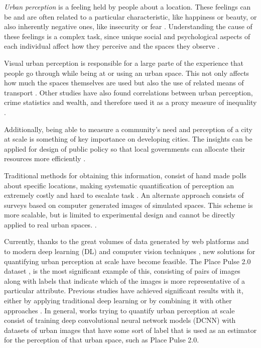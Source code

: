 \textit{Urban perception} is a feeling held by people about a location. These feelings can be and
are often related to a particular characteristic, like happiness or beauty, or also
inherently negative ones, like insecurity or fear \cite{tamara_judgments}. Understanding the
cause of these feelings is a complex task, since unique social and psychological aspects
of each individual affect how they perceive and the spaces they observe \cite{nasar_perception}.

Visual urban perception is  responsible for a large parte of the experience that people
go through while  being at or using an urban space. This not only affects how much the spaces
themselves are used \cite{khisty} but also the use of related means of transport \cite{antonakos}.
Other studies have also found correlations between urban perception, crime statistics \cite{tamara_judgments}
and wealth, and therefore used it as a proxy measure of inequality \cite{tamara_judgments,hidalgo_inequality, rossetti}.

Additionally, being able to measure a community's need and perception of a city at scale is something
of key importance on developing cities. The insights can be applied for design of public policy
so that local governments can allocate their resources more efficiently \cite{santani}.

Traditional methods for obtaining this information, consist of hand made polls
about specific locations, making systematic quantification of perception  an extremely costly and hard
to escalate task \cite{nasar_perception,clifton}. An alternate approach consists of surveys based on
computer generated images of simulated spaces. This scheme is more scalable, but is limited to experimental
design and cannot be directly applied to real urban spaces. \cite{lain_grenspace,iglesias_perception}.

Currently, thanks to the great volumes of data generated by web platforms \cite{hidalgo_inequality}
and to modern deep learning (DL) and computer vision techniques \cite{lecun_dl}, new solutions for
quantifying urban perception at scale have become feasible. The Place Pulse 2.0 dataset \cite{hidalgo_placepulse},
is the most significant example of this, consisting of pairs of images
along with labels that indicate which of the images is more representative of a particular attribute.
Previous studies have achieved significant results with it, either by applying traditional deep learning \cite{hidalgo_placepulse}
or by combining it with other approaches \cite{rossetti, zhang_measuring}. In general, works trying to quantify
urban perception at scale consist of training deep convolutional neural network models (DCNN)
\cite{lecun_mnist} with datasets of urban images that have some sort of label that is used
as an estimator for the perception of that urban space, such as Place Pulse 2.0.

